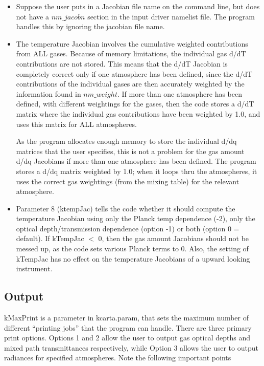 \documentclass[12pt]{article}
\begin{document}
{{{\begin{itemize}
\item Suppose the user puts in a Jacobian file name on the command line, 
      but does not have a $nm\_jacobn$ section in the input driver namelist 
      file. The program handles this by ignoring the jacobian file name.

\item The temperature Jacobian involves the cumulative weighted
  contributions from ALL gases.  Because of memory limitations, the
  individual gas d/dT contributions are not stored.  This means that
  the d/dT Jacobian is completely correct only if one atmosphere has
  been defined, since the d/dT contributions of the individual gases
  are then accurately weighted by the information found in $nm\_weight$.  If
  more than one atmosphere has been defined, with different weightings
  for the gases, then the code stores a d/dT matrix where the
  individual gas contributions have been weighted by 1.0, and uses
  this  matrix for ALL atmospheres.
  
  As the program allocates enough memory to store the individual d/dq
  matrices that the user specifies, this is not a problem for the gas
  amount d/dq Jacobians if more than one atmosphere has been defined.
  The program stores a d/dq matrix weighted by 1.0; when it loops thru
  the atmospheres, it uses the correct gas weightings (from the mixing
  table) for the relevant atmosphere.

\item Parameter 8 (ktempJac) tells the code whether it should compute the 
  temperature Jacobian using only the Planck temp dependence (-2), only
  the optical depth/transmission dependence (option -1) or both (option 0 
  = default). If kTempJac $<$ 0, then the gas amount Jacobians should not 
  be messed up, as the code sets various Planck terms to 0. Also, the 
  setting of kTempJac has no effect on the temperature Jacobians of a 
  upward looking instrument.

\end{itemize}

\subsection{Output}

kMaxPrint is a parameter in {\sf kcarta.param}, that sets the
maximum number of different ``printing jobs'' that the program can
handle.  There are three primary print options.  Options 1 and 2
allow the user to output gas optical depths and mixed path
transmittances respectively, while Option 3 allows the user to
output radiances for specified atmospheres.  Note the following
important points

}}}
\end{document}
